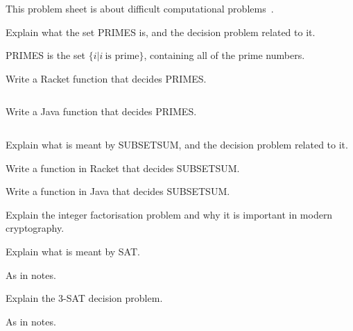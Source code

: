 \documentclass[addpoints,12pt]{exam}
\begin{document}

\noindent
This problem sheet is about difficult computational problems~\cite{sipserbook}.


\begin{questions}


\question
  Explain what the set PRIMES is, and the decision problem related to it.
  \begin{solution}
  PRIMES is the set $\{ i \vert i \ \textrm{is prime}  \}$, containing all of the prime numbers.
  \end{solution}


\question
  Write a Racket function that decides PRIMES.
  \begin{solution}
    \begin{verbatim}

    \end{verbatim}
  \end{solution}

\question
  Write a Java function that decides PRIMES.
  \begin{solution}
    \begin{verbatim}

    \end{verbatim}
  \end{solution}


\question
  Explain what is meant by SUBSETSUM, and the decision problem related to it.

\question
  Write a function in Racket that decides SUBSETSUM.

\question
  Write a function in Java that decides SUBSETSUM.

\question
  Explain the integer factorisation problem and why it is important in modern cryptography.

\question
  Explain what is meant by SAT.

  \begin{solution}
  As in notes.
  \end{solution}

\question
  Explain the 3-SAT decision problem.
  \begin{solution}
  As in notes.
  \end{solution}



\end{questions}





\end{document}
